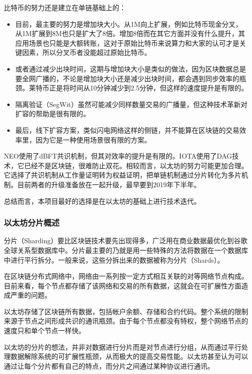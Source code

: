 \documentclass[a4paper,12pt]{article}
\begin{document}
比特币的努力还是建立在单链基础上的：

\begin{itemize}
\item 目前，最主要的努力是增加块大小。从1M向上扩展，例如比特币现金分叉，从1M扩展到8M也只是扩大了8倍。增加8倍而在其它方面并没有什么提升，其应用场景也只能是大额转账，这对于原始比特币来说算力和大家的认可才是关键因素，所以分叉币者没能超过原始比特币。
\item 或者通过减少出块时间，这期与增加块大小是类似的做法，因为区块数据总是要全网广播的，不论是增加块大小还是减少出块时间，都会遇到同步效率的瓶颈。莱特币正是将时间从10分钟减少到2.5分钟，但这样的速度提升是有限的。
\item 隔离验证（SegWit）虽然可能减少同样数量交易的广播量，但这种技术革新对扩容的帮助是很有限的。
\item 最后，线下扩容方案，类似闪电网络这样的侧链，并不能算在区块链的交易效率里，因为它是一种使用场景很有限的方案。
\end{itemize}

NEO使用了dBFT共识机制，但其对效率的提升是有限的。IOTA使用了DAG技术，它已经不是区块链，很难防止双花。相较而言，以太坊的努力可能更加合理。它选择了共识机制从工作量证明转为权益证明，把单链机制通过分片转化为多片机制。目前两者的升级准备放在一起升级，最早要到2019年下半年。

总结而言，本项目最好的选择是在以太坊的基础上进行技术迭代。

\subsubsection{以太坊分片概述}

分片（Sharding）要比区块链技术要先出现得多，广泛用在商业数据最优化到谷歌全球关系型数据库中。分片最主要的乃就是用一些特殊的方法将数据在一个数据库中进行平行拆分。一般来说，这些分拆出来的数据被称为分片（Shards）。

在区块链分布式网络中，网络由一系列按一定方式相互关联的对等网络节点构成。目前来看，每个节点都存储了该网络和交易的所有数据，这就会在可扩展性方面造成严重的问题。

以太坊存储了区块链所有数据，包括帐户余额、存储和合约代码。整个系统的限制来源于节点之间形成共识的通讯瓶颈。由于每个节点都没有特权，整个网络节点的速度只和单个节点一样快。

以太坊的分片的想法，并非对数据进行分片而是对节点进行分组，从而通过平行处理数据解除系统的可扩展性瓶颈，从而极大的提高交易性能。以太坊甚至认为可以通过让每个分片都有自己的特点，而分片之间通过某种协议进行通讯。
\end{document}
